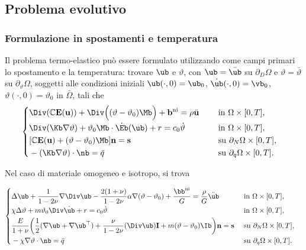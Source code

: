 \subsection{Problema evolutivo}
\subsubsection{Formulazione in spostamenti e temperatura}
Il problema termo-elastico può essere formulato utilizzando come campi primari lo spostamento e la temperatura: trovare $\ub$ e $\vartheta$, con $\ub=\bar\ub$ su 
$\partial_D\Omega$ e $\vartheta=\bar{\vartheta}$ su $\partial_\vartheta\Omega$, soggetti alle condizioni iniziali 	$\ub(\cdot, 0)=\ub_0$, 	$\dot\ub(\cdot, 0)=\vb_0$, $\vartheta(\cdot, 0)=\vartheta_0$ in $\bar\Omega$, tali che 
\begin{equation}
			\begin{cases}
			\begin{aligned}
				&\Div(\mathbb{C}\mathbf{E}(\mathbf{u}))+\Div \Big( (\vartheta-\vartheta_0)\Mb \Big)+\mathbf{b}^{\rm ni}=\rho\ddot{\mathbf{u}} 
				 \quad &&\mathrm{~in~}\Omega\times[0,T],\\
			&\Div (\Kb \nabla \vartheta)+\vartheta_0\Mb \cdot \dot\Eb(\ub)+r=c_0\dot{\vartheta}&&\mathrm{~in~}\Omega\times[0,T],\\
				&[\mathbb{C}\mathbf{E}(\mathbf{u})+(\vartheta-\vartheta_0)\Mb]\mathbf{n}=\mathbf{s} &&\mathrm{~su~}\partial_N\Omega\times[0,T],\\
				&-(\Kb \nabla\vartheta)\cdot \nb =\bar{q}&&\mathrm{~su~}\partial_q\Omega\times[0,T].\\
			\end{aligned}
	\end{cases}
\end{equation}

Nel caso di materiale omogeneo e isotropo, si trova

\begin{definition}
\begin{equation}
		\begin{cases}
		\begin{aligned}
			&\Delta \ub +\frac{1}{1-2\nu}\nabla \Div \ub-\frac{2(1+\nu)}{1-2\nu}\alpha\nabla(\vartheta-\vartheta_0)+\frac{\bb^{\rm ni}}{G}=\frac{\rho}{G}\ddot{\ub}  \quad &&\mathrm{~in~}\Omega\times[0,T],\\
	&	\chi \Delta \vartheta+m\vartheta_0 \Div\dot{\ub}+r=c_0\dot{\vartheta}&&\mathrm{~in~}\Omega\times[0,T],\\
			&\frac{E}{1+\nu}{\left(\frac12(\nabla \ub +\nabla \ub^\top)+\frac{\nu}{1-2\nu}(\Div \ub)\mathbf{I}+m(\vartheta-\vartheta_0)\Ib\right)}\mathbf{n}=\mathbf{s} &&\mathrm{~su~}\partial_N\Omega\times[0,T],\\
			&-\chi\nabla\vartheta\cdot \nb=\bar{q}&&\mathrm{~su~}\partial_q\Omega\times[0,T].
		\end{aligned}
	\end{cases}
\end{equation}
\end{definition}

